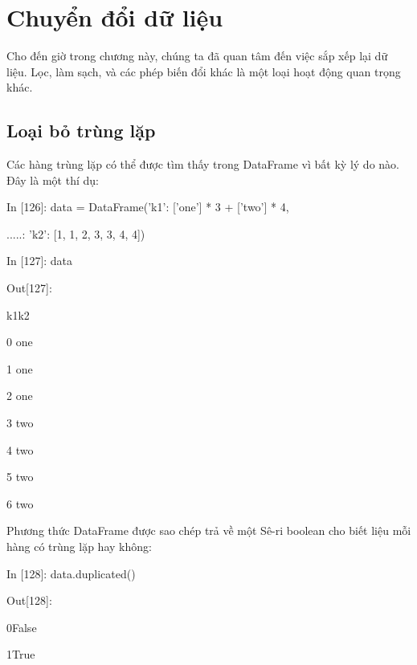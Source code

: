 \chapter{Chuyển đổi dữ liệu}
\begin{introchap3}
    Cho đến giờ trong chương này, chúng ta đã quan tâm đến việc sắp xếp lại dữ liệu. Lọc, làm sạch, và các phép biến đổi khác là một loại hoạt động quan trọng khác.
\end{introchap3}
\section{Loại bỏ trùng lặp}
Các hàng trùng lặp có thể được tìm thấy trong DataFrame vì bất kỳ lý do nào. Đây là một thí dụ:\par
    \quad\textup{In [126]: data = DataFrame({'k1': ['one'] * 3 + ['two'] * 4, }}\par
    \quad\textup{ .....: \quad\quad\quad\quad\quad\quad\quad\quad\quad\quad                    'k2': [1, 1, 2, 3, 3, 4, 4])}\par
    \quad\textup{In [127]: data  }\par
    \quad\textup{Out[127]: }\par
    \quad\quad\textup{k1\quad k2}\par
    \quad\textup{0 one  }\par
    \quad\textup{1 one  }\par
    \quad\textup{2 one  }\par
    \quad\textup{3 two  }\par
    \quad\textup{4 two  }\par
    \quad\textup{5 two  }\par
    \quad\textup{6 two  }\par
    \par
    Phương thức DataFrame được sao chép trả về một Sê-ri boolean cho biết liệu mỗi 
    hàng có trùng lặp hay không:\par
    \par
    \quad\textup{In [128]: data.duplicated() }\par
    \quad\textup{Out[128]: }\par
    \quad\textup{0\quad False}\par
    \quad\textup{1\quad True}\par

